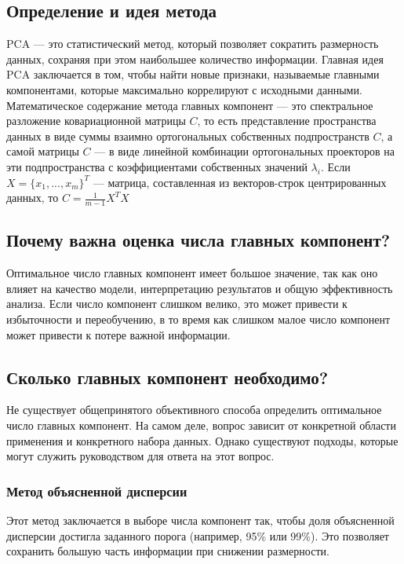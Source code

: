 \subsection{Определение и идея метода}
PCA — это статистический метод, который позволяет сократить размерность данных, сохраняя при этом наибольшее количество информации. Главная идея PCA заключается в том, чтобы найти новые признаки, называемые главными компонентами, которые максимально коррелируют с исходными данными.\\

Математическое содержание метода главных компонент — это спектральное разложение ковариационной матрицы $\displaystyle C$, то есть представление пространства данных в виде суммы взаимно ортогональных собственных подпространств
$\displaystyle C$, а самой матрицы $\displaystyle C$ — в виде линейной комбинации ортогональных проекторов на эти подпространства с коэффициентами собственных значений $\displaystyle \lambda _{i}$. Если $X = \{x_{1}, ... ,x_{m}\}^{T}$  — матрица, составленная из векторов-строк центрированных данных, то $\displaystyle C =\frac {1}{m-1} X ^{T} X$

\subsection{Почему важна оценка числа главных компонент?}
Оптимальное число главных компонент имеет большое значение, так как оно влияет на качество модели, интерпретацию результатов и общую эффективность анализа. Если число компонент слишком велико, это может привести к избыточности и переобучению, в то время как слишком малое число компонент может привести к потере важной информации.

\subsection{Сколько главных компонент необходимо?}

Не существует общепринятого объективного способа определить оптимальное число главных компонент. На самом деле, вопрос зависит от конкретной области применения и конкретного набора данных. Однако существуют подходы, которые могут служить руководством для ответа на этот вопрос.

\subsubsection{Метод объясненной дисперсии}
Этот метод заключается в выборе числа компонент так, чтобы доля объясненной дисперсии достигла заданного порога (например, 95\% или 99\%). Это позволяет сохранить большую часть информации при снижении размерности.

